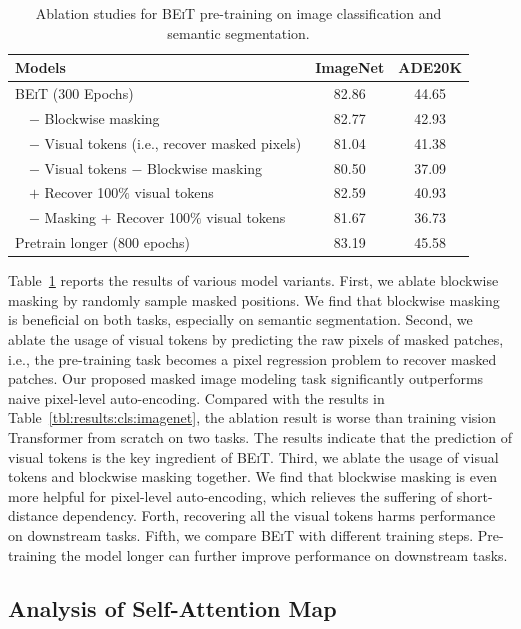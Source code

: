 \documentclass{article}
\newcommand\our{\textsc{BEiT}}
\begin{document}
\begin{table}[t]
\centering
\begin{tabular}{l c c}
\toprule
\bf Models & \bf ImageNet & \bf ADE20K \\
\midrule
\our{} (300 Epochs)                               & 82.86 & 44.65 \\
\midrule
~~$-$ Blockwise masking                           & 82.77 & 42.93 \\
~~$-$ Visual tokens (i.e., recover masked pixels) & 81.04 & 41.38 \\
~~$-$ Visual tokens $-$ Blockwise masking         & 80.50 & 37.09 \\
~~$+$ Recover 100$\%$ visual tokens               & 82.59 & 40.93 \\
~~$-$ Masking $+$ Recover 100$\%$ visual tokens   & 81.67 & 36.73 \\
\midrule
Pretrain longer ($800$ epochs)                    & 83.19 & 45.58 \\
\bottomrule
\end{tabular}
\caption{Ablation studies for \our{} pre-training on image classification and semantic segmentation.}
\label{tbl:ablation}
\end{table}


Table~\ref{tbl:ablation} reports the results of various model variants.
First, we ablate blockwise masking by randomly sample masked positions.
We find that blockwise masking is beneficial on both tasks, especially on semantic segmentation.
Second, we ablate the usage of visual tokens by predicting the raw pixels of masked patches, i.e., the pre-training task becomes a pixel regression problem to recover masked patches.
Our proposed masked image modeling task significantly outperforms naive pixel-level auto-encoding.
Compared with the results in Table~\ref{tbl:results:cls:imagenet}, the ablation result is worse than training vision Transformer from scratch on two tasks.
The results indicate that the prediction of visual tokens is the key ingredient of \our{}.
Third, we ablate the usage of visual tokens and blockwise masking together.
We find that blockwise masking is even more helpful for pixel-level auto-encoding, which relieves the suffering of short-distance dependency.
Forth, recovering all the visual tokens harms performance on downstream tasks.
Fifth, we compare \our{} with different training steps. Pre-training the model longer can further improve performance on downstream tasks.


\subsection{Analysis of Self-Attention Map}
\label{sec:analysis}
\end{document}
